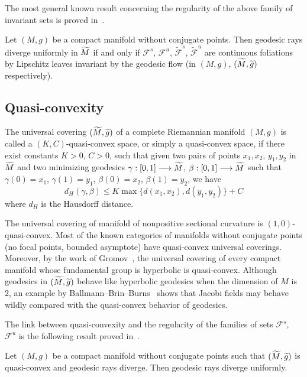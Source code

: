 \documentclass[AHL,Unicode,longabstracts,published]{cedram}
\newcommand{\clF}{\mathcal{F}}
\let\oldtilde\tilde
\renewcommand*{\tilde}[1]{\mathchoice{\widetilde{#1}}{\widetilde{#1}}{\oldtilde{#1}}{\oldtilde{#1}}}
\begin{document}
The most general known result concerning the regularity of the above family of invariant sets is proved in~\cite{kn:Ruggiero-Asterisque}.

\begin{theo}\label{divergence-continuity}
Let $(M,g)$ be a compact manifold without conjugate points. Then geodesic rays diverge uniformly in $\tilde{M}$ if and only if $\clF^{s}$, $\clF^{u}$, $\widetilde{\clF}^{s}$, $\widetilde{\clF}^{u}$ are continuous foliations by Lipschitz leaves invariant by the geodesic flow (in $(M,g)$, $(\tilde{M}, \tilde{g})$ respectively).
\end{theo}

\subsection{Quasi-convexity}

\begin{defi}\label{quasi-convexity}
The universal covering $(\tilde{M}, \tilde{g})$ of a complete Riemannian manifold $(M,g)$ is called a $(K,C)$-quasi-convex space, or simply a quasi-convex space, if there exist constants $K>0$, $C>0$, such that given two pairs of points $x_{1}, x_{2}$, $y_{1},y_{2}$ in $\tilde{M}$ and two minimizing geodesics $\gamma:[0,1] \longrightarrow \tilde{M}$, $\beta:[0,1] \longrightarrow \tilde{M}$ such that $\gamma(0)= x_{1}$, $\gamma(1)= y_{1}$, $\beta(0) = x_{2}$, $\beta(1)= y_{2}$, we have
\[
d_{H}(\gamma, \beta) \leq K\max\{ d(x_{1},x_{2}), d(y_{1},y_{2})\} + C
\]
where $d_{H}$ is the Hausdorff distance.
\end{defi}

The universal covering of manifold of nonpositive sectional curvature is $(1,0)$-quasi-convex. Most of the known categories of manifolds without conjugate points (no focal points, bounded asymptote) have quasi-convex universal coverings. Moreover, by the work of Gromov~\cite{kn:Gromov}, the universal covering of every compact manifold whose fundamental group is hyperbolic is quasi-convex. Although geodesics in $(\tilde{M},\tilde{g})$ behave like hyperbolic geodesics when the dimension of $M$ is $2$, an example by Ballmann--Brin--Burns~\cite{kn:BBB} shows that Jacobi fields may behave wildly compared with the quasi-convex behavior of geodesics.

The link between quasi-convexity and the regularity of the families of sets $\clF^{s}$, $\clF^{u}$ is the following result proved in~\cite{kn:Ruggiero-Ensaios}.

\begin{theo}\label{quasi-conv-continuity}
Let $(M,g)$ be a compact manifold without conjugate points such that $(\tilde{M}, \tilde{g})$ is quasi-convex and geodesic rays diverge. Then geodesic rays diverge uniformly.
\end{theo}
\end{document}
